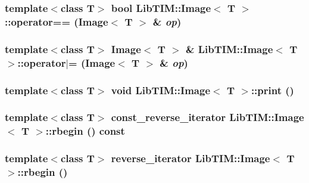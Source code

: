 \subsubsection{\setlength{\rightskip}{0pt plus 5cm}template$<$class T$>$ bool {\bf Lib\-TIM::Image}$<$ T $>$::operator== ({\bf Image}$<$ T $>$ \& {\em op})\hspace{0.3cm}{\tt  [inline, inherited]}}\label{group__Image_ga54}


\subsubsection{\setlength{\rightskip}{0pt plus 5cm}template$<$class T$>$ Image$<$ T $>$ \& {\bf Lib\-TIM::Image}$<$ T $>$::operator$|$= ({\bf Image}$<$ T $>$ \& {\em op})\hspace{0.3cm}{\tt  [inherited]}}\label{group__Image_ga52}


\subsubsection{\setlength{\rightskip}{0pt plus 5cm}template$<$class T$>$ void {\bf Lib\-TIM::Image}$<$ T $>$::print ()\hspace{0.3cm}{\tt  [inline, inherited]}}\label{group__Image_ga67}


\subsubsection{\setlength{\rightskip}{0pt plus 5cm}template$<$class T$>$ const\_\-reverse\_\-iterator {\bf Lib\-TIM::Image}$<$ T $>$::rbegin () const\hspace{0.3cm}{\tt  [inline, inherited]}}\label{group__Image_ga38}


\subsubsection{\setlength{\rightskip}{0pt plus 5cm}template$<$class T$>$ reverse\_\-iterator {\bf Lib\-TIM::Image}$<$ T $>$::rbegin ()\hspace{0.3cm}{\tt  [inline, inherited]}}\label{group__Image_ga37}


